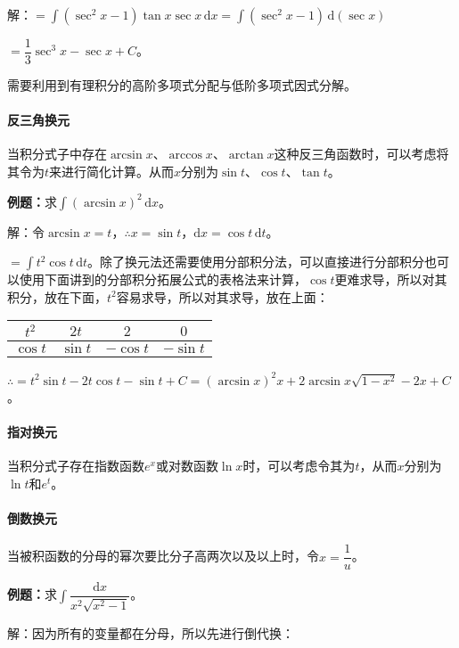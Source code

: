 \documentclass[UTF8, 12pt]{ctexart}
\begin{document}
解：$=\displaystyle{\int(\sec^2x-1)}\tan x\sec x\,\textrm{d}x=\displaystyle{\int(\sec^2x-1)}\,\textrm{d}(\sec x)$

$=\dfrac{1}{3}\sec^3x-\sec x+C$。

需要利用到有理积分的高阶多项式分配与低阶多项式因式分解。

\paragraph{反三角换元} \leavevmode \medskip

当积分式子中存在$\arcsin x$、$\arccos x$、$\arctan x$这种反三角函数时，可以考虑将其令为$t$来进行简化计算。从而$x$分别为$\sin t$、$\cos t$、$\tan t$。

\textbf{例题：}求$\int(\arcsin x)^2\,\textrm{d}x$。

解：令$\arcsin x=t$，$\therefore x=\sin t$，$\textrm{d}x=\cos t\,\textrm{d}t$。

$=\int t^2\cos t\,\textrm{d}t$。除了换元法还需要使用分部积分法，可以直接进行分部积分也可以使用下面讲到的分部积分拓展公式的表格法来计算，$\cos t$更难求导，所以对其积分，放在下面，$t^2$容易求导，所以对其求导，放在上面：\medskip

\begin{tabular}{|c|c|c|c|}
    \hline
    $t^2$ & $2t$ & $2$ & $0$ \\ \hline
    $\cos t$ & $\sin t$ & $-\cos t$ & $-\sin t$ \\
    \hline
\end{tabular} \medskip

$\therefore=t^2\sin t-2t\cos t-\sin t+C=(\arcsin x)^2x+2\arcsin x\sqrt{1-x^2}-2x+C$。

\paragraph{指对换元} \leavevmode \medskip

当积分式子存在指数函数$e^x$或对数函数$\ln x$时，可以考虑令其为$t$，从而$x$分别为$\ln t$和$e^t$。

\paragraph{倒数换元} \leavevmode \medskip

当被积函数的分母的幂次要比分子高两次以及以上时，令$x=\dfrac{1}{u}$。

\textbf{例题：}求$\displaystyle{\int\dfrac{\textrm{d}x}{x^2\sqrt{x^2-1}}}$。

解：因为所有的变量都在分母，所以先进行倒代换：
\end{document}
